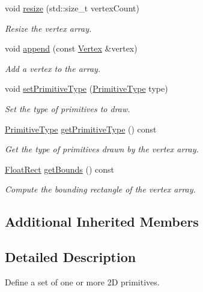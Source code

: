 \begin{DoxyCompactItemize}
void \hyperlink{classsf_1_1_vertex_array_a0c0fe239e8f9a54e64d3bbc96bf548c0}{resize} (std\+::size\+\_\+t vertex\+Count)
\begin{DoxyCompactList}\small\item\em Resize the vertex array. \end{DoxyCompactList}\item 
void \hyperlink{classsf_1_1_vertex_array_a80c8f6865e53bd21fc6cb10fffa10035}{append} (const \hyperlink{classsf_1_1_vertex}{Vertex} \&vertex)
\begin{DoxyCompactList}\small\item\em Add a vertex to the array. \end{DoxyCompactList}\item 
void \hyperlink{classsf_1_1_vertex_array_aa38c10707c28a97f4627ae8b2f3ad969}{set\+Primitive\+Type} (\hyperlink{group__graphics_ga5ee56ac1339984909610713096283b1b}{Primitive\+Type} type)
\begin{DoxyCompactList}\small\item\em Set the type of primitives to draw. \end{DoxyCompactList}\item 
\hyperlink{group__graphics_ga5ee56ac1339984909610713096283b1b}{Primitive\+Type} \hyperlink{classsf_1_1_vertex_array_aa1a60d84543aa6e220683349b645f130}{get\+Primitive\+Type} () const
\begin{DoxyCompactList}\small\item\em Get the type of primitives drawn by the vertex array. \end{DoxyCompactList}\item 
\hyperlink{classsf_1_1_rect}{Float\+Rect} \hyperlink{classsf_1_1_vertex_array_abd57744c732abfc7d4c98d8e1d4ccca1}{get\+Bounds} () const
\begin{DoxyCompactList}\small\item\em Compute the bounding rectangle of the vertex array. \end{DoxyCompactList}\end{DoxyCompactItemize}
\subsection*{Additional Inherited Members}


\subsection{Detailed Description}
Define a set of one or more 2D primitives. 

